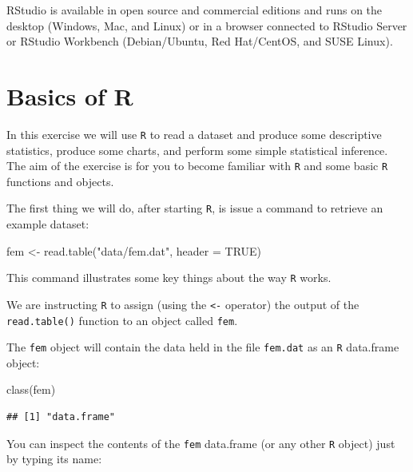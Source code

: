 \documentclass[
  12pt,
]{book}
\newenvironment{Shaded}{\begin{snugshade}}{\end{snugshade}}
\newcommand{\AttributeTok}[1]{\textcolor[rgb]{0.77,0.63,0.00}{#1}}
\newcommand{\ConstantTok}[1]{\textcolor[rgb]{0.00,0.00,0.00}{#1}}
\newcommand{\FunctionTok}[1]{\textcolor[rgb]{0.00,0.00,0.00}{#1}}
\newcommand{\NormalTok}[1]{#1}
\newcommand{\OtherTok}[1]{\textcolor[rgb]{0.56,0.35,0.01}{#1}}
\newcommand{\StringTok}[1]{\textcolor[rgb]{0.31,0.60,0.02}{#1}}
\begin{document}
RStudio is available in open source and commercial editions and runs on the desktop (Windows, Mac, and Linux) or in a browser connected to RStudio Server or RStudio Workbench (Debian/Ubuntu, Red Hat/CentOS, and SUSE Linux).

\hypertarget{basics-r}{%
\chapter{Basics of R}\label{basics-r}}

In this exercise we will use \texttt{R} to read a dataset and produce some descriptive statistics, produce some charts, and perform some simple statistical inference. The aim of the exercise is for you to become familiar with \texttt{R} and some basic \texttt{R} functions and objects.

The first thing we will do, after starting \texttt{R}, is issue a command to retrieve an example dataset:

\begin{Shaded}
\begin{Highlighting}[]
\NormalTok{fem }\OtherTok{\textless{}{-}} \FunctionTok{read.table}\NormalTok{(}\StringTok{"data/fem.dat"}\NormalTok{, }\AttributeTok{header =} \ConstantTok{TRUE}\NormalTok{)}
\end{Highlighting}
\end{Shaded}

This command illustrates some key things about the way \texttt{R} works.

We are instructing \texttt{R} to assign (using the \texttt{\textless{}-} operator) the output of the \texttt{read.table()} function to an object
called \texttt{fem}.

The \texttt{fem} object will contain the data held in the file \texttt{fem.dat} as an \texttt{R} data.frame object:

\begin{Shaded}
\begin{Highlighting}[]
\FunctionTok{class}\NormalTok{(fem)}
\end{Highlighting}
\end{Shaded}

\begin{verbatim}
## [1] "data.frame"
\end{verbatim}

\newpage

You can inspect the contents of the \texttt{fem} data.frame (or any other \texttt{R} object) just by typing its name:
\end{document}
